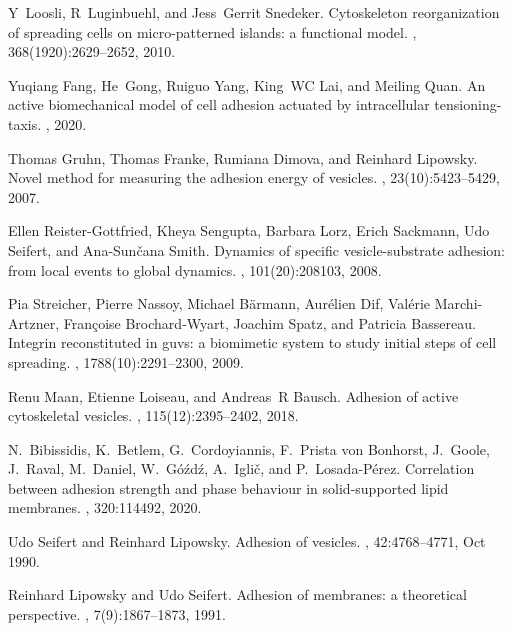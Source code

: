 \documentclass[pre,amsmath]{revtex4}
\begin{document}
\begin{thebibliography}{10}
Y~Loosli, R~Luginbuehl, and Jess~Gerrit Snedeker.
\newblock Cytoskeleton reorganization of spreading cells on micro-patterned
  islands: a functional model.
, 368(1920):2629--2652, 2010.

Yuqiang Fang, He~Gong, Ruiguo Yang, King~WC Lai, and Meiling Quan.
\newblock An active biomechanical model of cell adhesion actuated by
  intracellular tensioning-taxis.
, 2020.

Thomas Gruhn, Thomas Franke, Rumiana Dimova, and Reinhard Lipowsky.
\newblock Novel method for measuring the adhesion energy of vesicles.
, 23(10):5423--5429, 2007.

Ellen Reister-Gottfried, Kheya Sengupta, Barbara Lorz, Erich Sackmann, Udo
  Seifert, and Ana-Sun{\v{c}}ana Smith.
\newblock Dynamics of specific vesicle-substrate adhesion: from local events to
  global dynamics.
, 101(20):208103, 2008.

Pia Streicher, Pierre Nassoy, Michael B{\"a}rmann, Aur{\'e}lien Dif,
  Val{\'e}rie Marchi-Artzner, Fran{\c{c}}oise Brochard-Wyart, Joachim Spatz,
  and Patricia Bassereau.
\newblock Integrin reconstituted in guvs: a biomimetic system to study initial
  steps of cell spreading.
,
  1788(10):2291--2300, 2009.

Renu Maan, Etienne Loiseau, and Andreas~R Bausch.
\newblock Adhesion of active cytoskeletal vesicles.
, 115(12):2395--2402, 2018.

N.~Bibissidis, K.~Betlem, G.~Cordoyiannis, F.~Prista von Bonhorst, J.~Goole,
  J.~Raval, M.~Daniel, W.~Góźdź, A.~Iglič, and P.~Losada-Pérez.
\newblock Correlation between adhesion strength and phase behaviour in
  solid-supported lipid membranes.
, 320:114492, 2020.

Udo Seifert and Reinhard Lipowsky.
\newblock Adhesion of vesicles.
, 42:4768--4771, Oct 1990.

Reinhard Lipowsky and Udo Seifert.
\newblock Adhesion of membranes: a theoretical perspective.
, 7(9):1867--1873, 1991.


\end{thebibliography}
\end{document}
